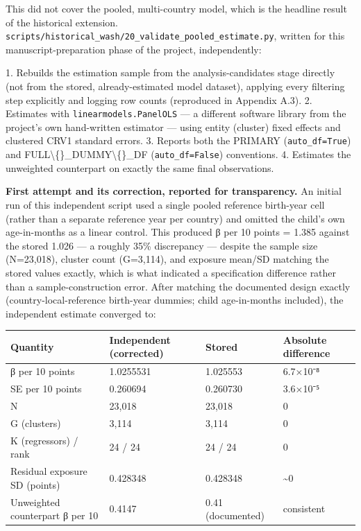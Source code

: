 This did not cover the pooled, multi-country model, which is the headline result of the historical extension. \texttt{scripts/historical\_wash/20\_validate\_pooled\_estimate.py}, written for this manuscript-preparation phase of the project, independently:

1. Rebuilds the estimation sample from the analysis-candidates stage directly (not from the stored, already-estimated model dataset), applying every filtering step explicitly and logging row counts (reproduced in Appendix A.3).
2. Estimates with \texttt{linearmodels.PanelOLS} --- a different software library from the project's own hand-written estimator --- using entity (cluster) fixed effects and clustered CRV1 standard errors.
3. Reports both the PRIMARY (\texttt{auto\_df=True}) and FULL\textbackslash\{\}\_DUMMY\textbackslash\{\}\_DF (\texttt{auto\_df=False}) conventions.
4. Estimates the unweighted counterpart on exactly the same final observations.

\textbf{First attempt and its correction, reported for transparency.} An initial run of this independent script used a single pooled reference birth-year cell (rather than a separate reference year per country) and omitted the child's own age-in-months as a linear control. This produced β per 10 points = 1.385 against the stored 1.026 --- a roughly 35\% discrepancy --- despite the sample size (N=23,018), cluster count (G=3,114), and exposure mean/SD matching the stored values exactly, which is what indicated a specification difference rather than a sample-construction error. After matching the documented design exactly (country-local-reference birth-year dummies; child age-in-months included), the independent estimate converged to:

\begingroup\fontsize{10}{15}\selectfont
\begin{longtable}{llll}
\toprule
Quantity & Independent (corrected) & Stored & Absolute difference \\
\midrule
\endhead
β per 10 points & 1.0255531 & 1.025553 & 6.7×10⁻⁸ \\
SE per 10 points & 0.260694 & 0.260730 & 3.6×10⁻⁵ \\
N & 23,018 & 23,018 & 0 \\
G (clusters) & 3,114 & 3,114 & 0 \\
K (regressors) / rank & 24 / 24 & 24 / 24 & 0 \\
Residual exposure SD (points) & 0.428348 & 0.428348 & \textasciitilde{}0 \\
Unweighted counterpart β per 10 & 0.4147 & 0.41 (documented) & consistent \\
\bottomrule
\end{longtable}
\endgroup

